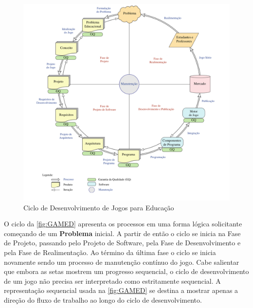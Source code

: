 \pagebreak

\begin{figure}[htb]

	\caption{\label{fig:GAMED}Ciclo de Desenvolvimento de Jogos para Educação}
  \begin{center}%
    \includegraphics[width=1.05\linewidth]{./Figuras/GAMED.pdf}
	\end{center}%

\end{figure}

O ciclo da \autoref{fig:GAMED} apresenta os processos em uma forma lógica solicitante começando de um \textbf{Problema} inicial. A partir de então o ciclo se inicia na Fase de Projeto, passando pelo Projeto de Software, pela Fase de Desenvolvimento e pela Fase de Realimentação. Ao término da última fase o ciclo se inicia novamente sendo um processo de manutenção contínuo do jogo. Cabe salientar que embora as setas mostrem um progresso sequencial, o ciclo de desenvolvimento de um jogo não precisa ser interpretado como estritamente sequencial. A representação sequencial usada na \autoref{fig:GAMED} se destina a mostrar apenas a direção do fluxo de trabalho ao longo do ciclo de desenvolvimento. 

